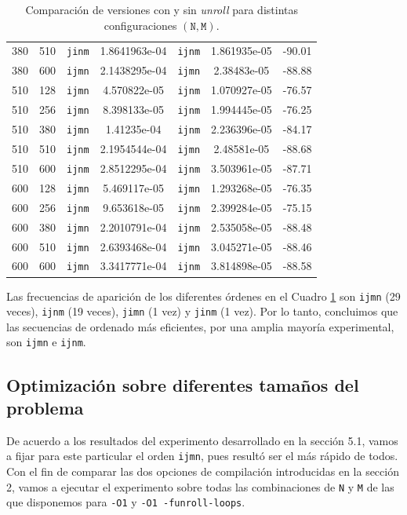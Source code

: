 \documentclass[11pt,a4paper,twoside]{article}
\theoremstyle{definition}
\begin{document}
\begin{table}[H]
\begin{tabular}{|c|c|c|c|c|c|c|}
			380 & 510 & \texttt{jinm} & 1.8641963e-04 & \texttt{ijnm} & 1.861935e-05 & -90.01 \\
			380 & 600 & \texttt{ijmn} & 2.1438295e-04 & \texttt{ijmn} & 2.38483e-05 & -88.88 \\
			510 & 128 & \texttt{ijmn} & 4.570822e-05 & \texttt{ijnm} & 1.070927e-05 & -76.57 \\
			510 & 256 & \texttt{ijmn} & 8.398133e-05 & \texttt{ijnm} & 1.994445e-05 & -76.25 \\
			510 & 380 & \texttt{ijmn} & 1.41235e-04 & \texttt{ijnm} & 2.236396e-05 & -84.17 \\
			510 & 510 & \texttt{ijnm} & 2.1954544e-04 & \texttt{ijmn} & 2.48581e-05 & -88.68 \\
			510 & 600 & \texttt{ijnm} & 2.8512295e-04 & \texttt{ijnm} & 3.503961e-05 & -87.71 \\
			600 & 128 & \texttt{ijmn} & 5.469117e-05 & \texttt{ijmn} & 1.293268e-05 & -76.35 \\
			600 & 256 & \texttt{ijnm} & 9.653618e-05 & \texttt{ijnm} & 2.399284e-05 & -75.15 \\
			600 & 380 & \texttt{ijmn} & 2.2010791e-04 & \texttt{ijnm} & 2.535058e-05 & -88.48 \\
			600 & 510 & \texttt{ijmn} & 2.6393468e-04 & \texttt{ijmn} & 3.045271e-05 & -88.46 \\
			600 & 600 & \texttt{ijmn} & 3.3417771e-04 & \texttt{ijnm} & 3.814898e-05 & -88.58 \\
			\hline
		\end{tabular}
		\caption{Comparación de versiones con y sin \textit{unroll} para distintas configuraciones $(\texttt{N}, \texttt{M})$.}
		\label{graf2}
	\end{table}
	
	Las frecuencias de aparición de los diferentes órdenes en el Cuadro \ref{graf2} son \texttt{ijmn} (29 veces), \texttt{ijnm} (19 veces), \texttt{jimn} (1 vez) y \texttt{jinm} (1 vez). Por lo tanto, concluimos que las secuencias de ordenado más eficientes, por una amplia mayoría experimental, son \texttt{ijmn} e \texttt{ijnm}.
	
	
	\subsection{Optimización sobre diferentes tamaños del problema}
	
	De acuerdo a los resultados del experimento desarrollado en la sección 5.1, vamos a fijar para este particular el orden \texttt{ijmn}, pues resultó ser el más rápido de todos. Con el fin de comparar las dos opciones de compilación introducidas en la sección 2, vamos a ejecutar el experimento sobre todas las combinaciones de \texttt{N} y \texttt{M} de las que disponemos para \texttt{-O1} y \texttt{-O1 -funroll-loops}.
	
\end{document}
